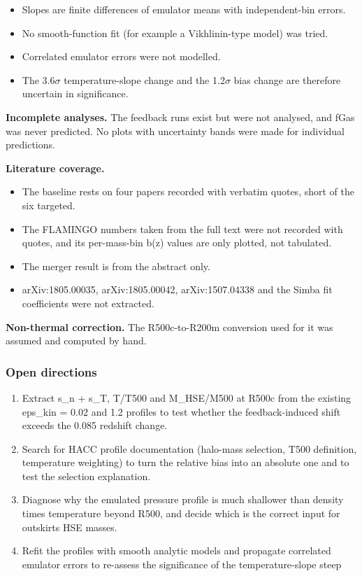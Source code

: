 \documentclass[11pt,a4paper]{article}
\begin{document}
\begin{itemize}
  \item Slopes are finite differences of emulator means with independent-bin errors.
  \item No smooth-function fit (for example a Vikhlinin-type model) was tried.
  \item Correlated emulator errors were not modelled.
  \item The 3.6$\sigma$ temperature-slope change and the 1.2$\sigma$ bias change are therefore uncertain in significance.
\end{itemize}
\textbf{Incomplete analyses.} The feedback runs exist but were not analysed, and fGas was never predicted. No plots with uncertainty bands were made for individual predictions.

\textbf{Literature coverage.}

\begin{itemize}
  \item The baseline rests on four papers recorded with verbatim quotes, short of the six targeted.
  \item The FLAMINGO numbers taken from the full text were not recorded with quotes, and its per-mass-bin b(z) values are only plotted, not tabulated.
  \item The merger result is from the abstract only.
  \item arXiv:1805.00035, arXiv:1805.00042, arXiv:1507.04338 and the Simba fit coefficients were not extracted.
\end{itemize}
\textbf{Non-thermal correction.} The R500c-to-R200m conversion used for it was assumed and computed by hand.

\subsubsection*{Open directions}
\begin{enumerate}
  \item Extract s\_n + s\_T, T/T500 and M\_HSE/M500 at R500c from the existing eps\_kin = 0.02 and 1.2 profiles to test whether the feedback-induced shift exceeds the 0.085 redshift change.
  \item Search for HACC profile documentation (halo-mass selection, T500 definition, temperature weighting) to turn the relative bias into an absolute one and to test the selection explanation.
  \item Diagnose why the emulated pressure profile is much shallower than density times temperature beyond R500, and decide which is the correct input for outskirts HSE masses.
  \item Refit the profiles with smooth analytic models and propagate correlated emulator errors to re-assess the significance of the temperature-slope steep
\end{enumerate}
\end{document}
